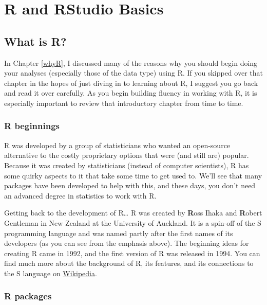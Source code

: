 \documentclass[]{tufte-book}
\begin{document}
\hypertarget{rstudiobasics}{%
\chapter{R and RStudio Basics}\label{rstudiobasics}}

\hypertarget{what-is-r}{%
\section{What is R?}\label{what-is-r}}

In Chapter \ref{whyR}, I discussed many of the reasons why you should begin doing your analyses (especially those of the data type) using R. If you skipped over that chapter in the hopes of just diving in to learning about R, I suggest you go back and read it over carefully. As you begin building fluency in working with R, it is especially important to review that introductory chapter from time to time.

\hypertarget{r-beginnings}{%
\subsection{R beginnings}\label{r-beginnings}}

R was developed by a group of statisticians who wanted an open-source alternative to the costly proprietary options that were (and still are) popular. Because it was created by statisticians (instead of computer scientists), R has some quirky aspects to it that take some time to get used to. We'll see that many packages have been developed to help with this, and these days, you don't need an advanced degree in statistics to work with R.

Getting back to the development of R\ldots{} R was created by \textbf{R}oss Ihaka and \textbf{R}obert Gentleman in New Zealand at the University of Auckland. It is a spin-off of the S programming language and was named partly after the first names of its developers (as you can see from the emphasis above). The beginning ideas for creating R came in 1992, and the first version of R was released in 1994. You can find much more about the background of R, its features, and its connections to the S language on \href{https://en.wikipedia.org/wiki/R_(programming_language)}{Wikipedia}.

\hypertarget{r-packages}{%
\subsection{R packages}\label{r-packages}}
\end{document}
